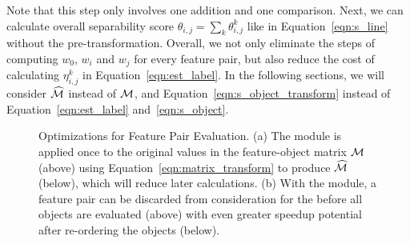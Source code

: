 Note that this step only involves one addition and one comparison. 
Next, we can calculate overall separability score $\theta_{i,j} = \sum_{k}{\theta_{i,j}^{k}}$ like in Equation~\ref{eqn:s_line} 
without the pre-transformation. Overall, 
we not only eliminate the steps of computing 
$w_0$, $w_i$ and $w_j$ for every feature pair, 
but also reduce the cost of calculating 
$\eta_{i,j}^{k}$ in Equation~\ref{eqn:est_label}. 
In the following sections, 
we will consider $\widehat{{\mathcal{M}}}$ instead of ${\mathcal{M}}$, 
and Equation~\ref{eqn:s_object_transform} instead of 
Equation~\ref{eqn:est_label} and~\ref{eqn:s_object}.

\begin{figure}[h]
\centering %
\vspace{-5mm}
\vspace{-5mm}
\caption{Optimizations for Feature Pair Evaluation. (a) The \trans module is applied once to the original values in the feature-object matrix ${\mathcal{M}}$ (above) using Equation~\ref{eqn:matrix_transform} to produce $\widehat{{\mathcal{M}}}$ (below), which will reduce later calculations. (b) With the \earlyT module, a feature pair can be discarded from consideration for the \topk before all objects are evaluated (above) with even greater speedup potential after re-ordering the objects (below).}
\vspace{-8mm}
\label{fig:trans_term}
\end{figure}

